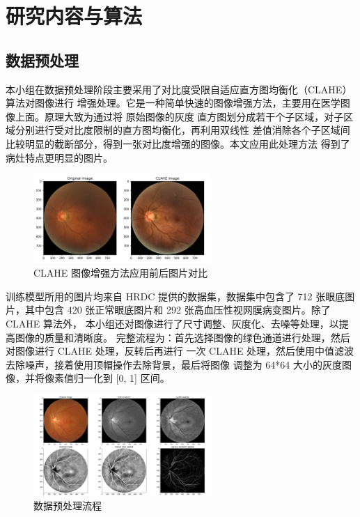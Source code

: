 \documentclass[UTF8,12pt,a4paper]{ctexart}
\begin{document}
\section{研究内容与算法}
\subsection{数据预处理}
本小组在数据预处理阶段主要采用了对比度受限自适应直方图均衡化（CLAHE）算法对图像进行
增强处理。它是一种简单快速的图像增强方法，主要用在医学图像上面。原理大致为通过将
原始图像的灰度
直方图划分成若干个子区域，对子区域分别进行受对比度限制的直方图均衡化，再利用双线性
差值消除各个子区域间比较明显的截断部分，得到一张对比度增强的图像。本文应用此处理方法
得到了病灶特点更明显的图片。
\begin{figure}[H]
	\centering
	\includegraphics[width=0.6\textwidth]{picture/clahe.png}
	\caption{CLAHE 图像增强方法应用前后图片对比}
\end{figure}

训练模型所用的图片均来自 HRDC 提供的数据集，数据集中包含了 712 张眼底图片，其中包含
420 张正常眼底图片和 292 张高血压性视网膜病变图片。除了 CLAHE 算法外，
本小组还对图像进行了尺寸调整、灰度化、去噪等处理，以提高图像的质量和清晰度。
完整流程为：首先选择图像的绿色通道进行处理，然后对图像进行 CLAHE 处理，反转后再进行
一次 CLAHE 处理，然后使用中值滤波去除噪声，接着使用顶帽操作去除背景，最后将图像
调整为 64*64 大小的灰度图像，并将像素值归一化到 [0, 1] 区间。
\begin{figure}[H]
	\centering
	\includegraphics[width=0.6\textwidth]{picture/preprocess.png}
	\caption{数据预处理流程}
\end{figure}
\end{document}
